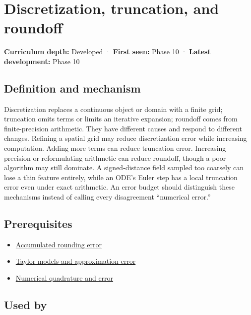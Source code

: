 \hypertarget{appendix-6b0648b2b8e8}{}\label{referencestart:appendix-6b0648b2b8e8}
\section{Discretization, truncation, and roundoff}\label{appendix-6b0648b2b8e8-discretization-truncation-and-roundoff}

\textbf{Curriculum depth:} Developed · \textbf{First seen:} Phase 10 · \textbf{Latest development:} Phase 10

\subsection{Definition and mechanism}\label{appendix-6b0648b2b8e8-definition-and-mechanism}

Discretization replaces a continuous object or domain with a finite grid; truncation omits terms or limits an iterative expansion; roundoff comes from finite-precision arithmetic. They have different causes and respond to different changes. Refining a spatial grid may reduce discretization error while increasing computation. Adding more terms can reduce truncation error. Increasing precision or reformulating arithmetic can reduce roundoff, though a poor algorithm may still dominate. A signed-distance field sampled too coarsely can lose a thin feature entirely, while an ODE's Euler step has a local truncation error even under exact arithmetic. An error budget should distinguish these mechanisms instead of calling every disagreement ``numerical error.''

\subsection{Prerequisites}\label{appendix-6b0648b2b8e8-prerequisites}

\begin{itemize}
\tightlist
\item
  \hyperref[appendix-f82e270791c8]{Accumulated rounding error}
\item
  \hyperref[appendix-32f39e9a3738]{Taylor models and approximation error}
\item
  \hyperref[appendix-80521eae6b71]{Numerical quadrature and error}
\end{itemize}

\subsection{Used by}\label{appendix-6b0648b2b8e8-used-by}

